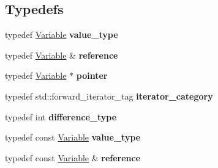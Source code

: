 \subsection*{Typedefs}
\begin{DoxyCompactItemize}
\item 
\mbox{\label{group___thin_var_dep_interface___c_l_a_s_s_e_s_ga388393e12ff087b10e20afbbadf95322}} 
typedef \mbox{\hyperlink{class_s_m_spp__di__unipi__it_1_1_variable}{Variable}} {\bfseries value\+\_\+type}
\item 
\mbox{\label{group___thin_var_dep_interface___c_l_a_s_s_e_s_gac16239c19684e6b52adbfeccfd7c5857}} 
typedef \mbox{\hyperlink{class_s_m_spp__di__unipi__it_1_1_variable}{Variable}} \& {\bfseries reference}
\item 
\mbox{\label{group___thin_var_dep_interface___c_l_a_s_s_e_s_ga44085cdab6e8118d763573e376dfbc74}} 
typedef \mbox{\hyperlink{class_s_m_spp__di__unipi__it_1_1_variable}{Variable}} $\ast$ {\bfseries pointer}
\item 
\mbox{\label{group___thin_var_dep_interface___c_l_a_s_s_e_s_ga2a41d9d5b27b3a9cd6d9918c6eddc848}} 
typedef std\+::forward\+\_\+iterator\+\_\+tag {\bfseries iterator\+\_\+category}
\item 
\mbox{\label{group___thin_var_dep_interface___c_l_a_s_s_e_s_gae1e359864f6fce787ce08ee3d43ebf34}} 
typedef int {\bfseries difference\+\_\+type}
\item 
\mbox{\label{group___thin_var_dep_interface___c_l_a_s_s_e_s_gac44d92d51e8bc80f1251d94fe659dcfb}} 
typedef const \mbox{\hyperlink{class_s_m_spp__di__unipi__it_1_1_variable}{Variable}} {\bfseries value\+\_\+type}
\item 
\mbox{\label{group___thin_var_dep_interface___c_l_a_s_s_e_s_ga34eb520c7986e4b3b6ea61f4d30bbc19}} 
typedef const \mbox{\hyperlink{class_s_m_spp__di__unipi__it_1_1_variable}{Variable}} \& {\bfseries reference}
\item 

\end{DoxyCompactItemize}
